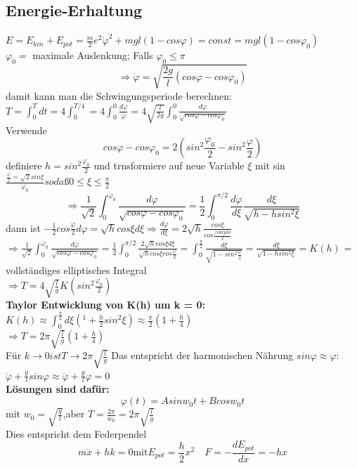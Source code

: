 \documentclass[11pt]{article}
\begin{document}
						\subsection{Energie-Erhaltung}
							\quad$ E = E_{kin} + E_{pot} = \frac{m}{2} e^2 \dot{\varphi}^2 + mgl(1 - cos \varphi)= const = mgl(1 - cos \varphi_0) $\\
							$ \varphi_0 =$ maximale Auslenkung; Falls $\varphi_0 \leq \pi$\\
							\[ \Rightarrow \dot{\varphi} = \sqrt{\frac{2g}{l}(cos \varphi - cos \varphi_0) } \]
							damit kann man die Schwingungsperiode berechnen:\\
							$T = \int_{0}^{T}dt = 4 \int_{0}^{T/4} = 4 \int_{0}^{0} \frac{d\varphi}{\dot{\varphi}} = 4 \sqrt{\frac{l}{2g}} \int_{0}^{0} \frac{d\varphi}{\sqrt{cos \varphi - cos \varphi_0}} $\\
							Verwende 
							\[ cos \varphi - cos \varphi_0 = 2(sin^2\frac{\varphi_0}{2} - sin^2 \frac{\varphi}{2}) \]
							definiere $h = sin^2 \frac{\varphi_0}{2}$ und trnsformiere auf neue Variable $\xi$ mit  sin $\frac{\frac{\varphi}{2} = \sqrt{2} sin \xi}{\varphi_0} so daß 0 \leq \xi \leq \frac{\pi}{2}$
							\[ \Rightarrow \frac{1}{\sqrt{2}} \int_{0}^{\varphi_0} \frac{d\varphi}{\sqrt{cos \varphi - cos \varphi_0}} = \frac{1}{2} \int_{0}^{\pi / 2} \frac{d \varphi}{d \xi} \frac{d \xi}{\sqrt{h - h sin^2\xi}} \]
							dann ist $-\frac{1}{2} cos \frac{\varphi}{2} d\varphi = \sqrt{h} cos \xi d \xi \Rightarrow \frac{d \varphi}{d \xi} = 2 \sqrt{h} \frac{cos \xi}{cos \frac{/varphi}{2}}$\\
							$ \Rightarrow \frac{1}{\sqrt{2}} \int_{0}^{\varphi_0} \frac{d \varphi}{\sqrt{cos \varphi - cos \varphi_0}} = \frac{1}{2} \int_{0}^{\pi/2} \frac{2 \sqrt{h} cos \xi d\xi}{\sqrt{h} cos \xi cos \frac{\varphi}{2}} = \int_{0}^{\frac{\pi}{2}} \frac{d \xi}{\sqrt{1 - sin^2 \frac{\varphi}{2}}} = \frac{d \xi}{\sqrt{1 -h sin^2\xi}} = K(h)$ = vollständiges elliptisches Integral \\
							$ \Rightarrow T= 4 \sqrt{\frac{l}{g}} K(sin^2 \frac{\varphi_0}{2}) $\\
							\textbf{Taylor Entwicklung von K(h) um k = 0:}\\
								$K(h) \approx \int_{0}^{\frac{\pi}{2}} d\xi (^1 + \frac{h}{2} sin^2 \xi) \approx \frac{\pi}{2}(1+\frac{h}{4})$\\
								$ \Rightarrow T = 2\pi \sqrt{\frac{l}{g}}(1 +  \frac{h}{4}) $\\
								Für $k \rightarrow 0 ist T \rightarrow 2\pi \sqrt{\frac{l}{g}}$ Das entspricht der harmonischen Nährung $sin \varphi \approx \varphi$:\\
								$\ddot{\varphi} + \frac{g}{l} sin \varphi \approx \ddot{\varphi} + \frac{g}{l} \varphi = 0 $\\
								\textbf{Lösungen sind dafür:}
									\[ \varphi(t) = A sin w_0 t + B cos w_0 t \]
									mit $w_0 =\sqrt{\frac{g}{l}}$,aber $T = \frac{2 \pi}{w_0} = 2\pi \sqrt{\frac{l}{g}}$\\
									Dies entspricht dem Federpendel
									\[ m \ddot{x} + hk = 0 \text{mit} E_{pot} = \frac{h}{2}x^2 \quad F = - \frac{d E_{pot}}{dx} = - hx \] 
\end{document}
